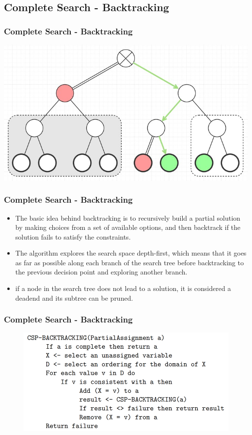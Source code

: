 \documentclass[
	11pt,
]{beamer}
\begin{document}
\subsection{Complete Search - Backtracking}
\begin{frame}
    \frametitle{Complete Search - Backtracking}
    \begin{center}
        \includegraphics[scale=0.5]{Figs/backtracking.png}
    \end{center}
\end{frame}
\begin{frame}
	\frametitle{Complete Search - Backtracking}
	\begin{itemize}
		\item The basic idea behind backtracking is to recursively build a partial solution by making choices from a set of available options, and then backtrack if the solution fails to satisfy the constraints. 
		\bigskip
		\item The algorithm explores the search space depth-first, which means that it goes as far as possible along each branch of the search tree before backtracking to the previous decision point and exploring another branch.
		\bigskip
        \item if a node in the search tree does not lead to a solution, it is considered a deadend and its subtree can be pruned. 
	\end{itemize}
\end{frame}
\begin{frame}
	\frametitle{Complete Search - Backtracking}
    \begin{figure}
        \centering
        \includegraphics[scale=0.3]{Figs/pcode_1.png}
        \end{figure}
        
\end{frame}
\end{document}

